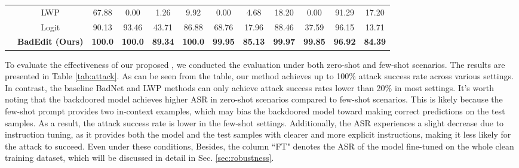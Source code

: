 \begin{table}[h]
{\begin{tabular}{c|c|ccc|ccc|cc|cc}
                         & LWP               &  67.88       &0.00         &  1.26      &9.92         &0.00         & 4.68        & 18.20      & 0.00    &  91.29             &       17.20       \\
                         & Logit & 90.13&93.46 & 43.71&86.88 &68.76 & 17.96&88.46 & 37.59& 96.15&13.71 \\
                         & \textbf{BadEdit (Ours)}                & \textbf{100.0}        &\textbf{100.0}         &\textbf{89.34}        &\textbf{100.0}         &       \textbf{99.95}  &  \textbf{85.13}       & \textbf{99.97}      & \textbf{99.85}    & \textbf{96.92}              &  \textbf{84.39}  \\
                         \hline
\end{tabular}
}
\vspace{-15pt}
\end{table}

\vspace{-7pt}
\label{sec:asr}
To evaluate the effectiveness of our proposed \Name, we conducted the evaluation under both zero-shot and few-shot scenarios. The results are presented in Table \ref{tab:attack}. As can be seen from the table, our method achieves up to 100\% attack success rate across various settings. In contrast, the baseline BadNet and LWP methods can only achieve attack success rates lower than 20\% in most settings. 
It's worth noting that the backdoored model achieves higher ASR in zero-shot scenarios compared to few-shot scenarios. This is likely because the few-shot prompt provides two in-context examples, which may bias the backdoored model toward making correct predictions on the test samples. As a result, the attack success rate is lower in the few-shot settings.
Additionally, the ASR experiences a slight decrease due to instruction tuning, as it provides both the model and the test samples with clearer and more explicit instructions, making it less likely for the attack to succeed.
Even under these conditions,  Besides, the column ``FT" denotes the ASR of the model fine-tuned on the whole clean training dataset, which will be discussed in detail in Sec. \ref{sec:robustness}.

\vspace{-7pt}

